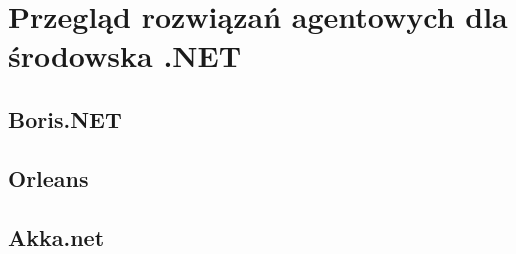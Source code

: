 \section{Przegląd rozwiązań agentowych dla środowska .NET}

\subsection{Boris.NET}
\subsection{Orleans}
\subsection{Akka.net}